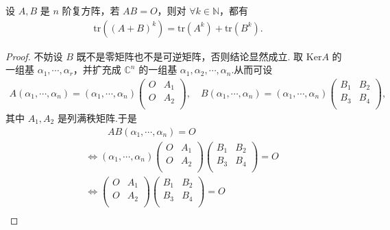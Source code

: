 \documentclass[../../main.tex]{subfiles}%
\begin{document}
\begin{example}
设 $A,B$ 是 $n$ 阶复方阵，若 $AB=O$，则对 $\forall k\in \mathbb{N}$，都有
\begin{align*}
\mathrm{tr}\left( \left( A+B \right) ^k \right) =\mathrm{tr}\left( A^k \right) +\mathrm{tr}\left( B^k \right) .
\end{align*}
\end{example}
\begin{proof}

不妨设 $B$ 既不是零矩阵也不是可逆矩阵，否则结论显然成立.
取 $\mathrm{Ker}A$ 的一组基 $\alpha _1,\cdots ,\alpha _r$，并扩充成 $\mathbb{C} ^n$ 的一组基 $\alpha _1,\alpha _2,\cdots ,\alpha _n$.从而可设
\begin{align*}
A\left( \alpha _1,\cdots ,\alpha _n \right) =\left( \alpha _1,\cdots ,\alpha _n \right) \begin{pmatrix}
O&		A_1\\
O&		A_2\\
\end{pmatrix}, \quad B\left( \alpha _1,\cdots ,\alpha _n \right) =\left( \alpha _1,\cdots ,\alpha _n \right) \begin{pmatrix}
B_1&		B_2\\
B_3&		B_4\\
\end{pmatrix},
\end{align*}
其中 $A_1,A_2$ 是列满秩矩阵.于是
\begin{align*}
&\quad \quad \,\, AB\left( \alpha _1,\cdots ,\alpha _n \right) =O\\
&\Longleftrightarrow \left( \alpha _1,\cdots ,\alpha _n \right) \begin{pmatrix}
O&		A_1\\
O&		A_2\\
\end{pmatrix} \begin{pmatrix}
B_1&		B_2\\
B_3&		B_4\\
\end{pmatrix} =O
\\
&\Longleftrightarrow \begin{pmatrix}
O&		A_1\\
O&		A_2\\
\end{pmatrix} \begin{pmatrix}
B_1&		B_2\\
B_3&		B_4\\
\end{pmatrix} =O
\\

\end{align*}
\end{proof}
\end{document}
